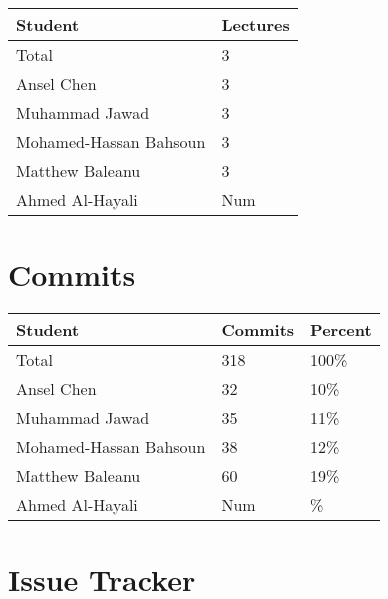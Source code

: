 \documentclass{article}
\begin{document}
\begin{table}[H]
\centering
\begin{tabular}{ll}
\toprule
\textbf{Student} & \textbf{Lectures}\\
\midrule
Total & 3\\
Ansel Chen & 3\\
Muhammad Jawad & 3\\
Mohamed-Hassan Bahsoun & 3\\
Matthew Baleanu & 3\\
Ahmed Al-Hayali & Num\\
\bottomrule
\end{tabular}
\end{table}


\section{Commits}


\begin{table}[H]
\centering
\begin{tabular}{lll}
\toprule
\textbf{Student} & \textbf{Commits} & \textbf{Percent}\\
\midrule
Total & 318 & 100\% \\
Ansel Chen & 32 & 10\% \\
Muhammad Jawad & 35 & 11\% \\
Mohamed-Hassan Bahsoun & 38 & 12\% \\
Matthew Baleanu & 60 & 19\% \\
Ahmed Al-Hayali & Num & \% \\
\bottomrule
\end{tabular}
\end{table}


\section{Issue Tracker}
\end{document}
